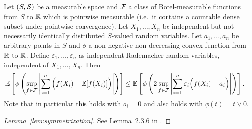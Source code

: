 \begin{lemma}
  \label{lem:symmetrization}

  Let $(S, \mathcal{S})$ be a measurable space and
  $\mathcal{F}$ a class of Borel-measurable functions
  from $S$ to $\mathbb{R}$ which is pointwise measurable
  (i.e.\ it contains a countable dense subset
  under pointwise convergence).
  Let $X_1, \ldots, X_n$
  be independent
  but not necessarily identically distributed
  $S$-valued random variables.
  Let $a_1, \ldots, a_n$ be arbitrary points in $S$
  and $\phi$ a non-negative non-decreasing convex function
  from $\mathbb{R}$ to $\mathbb{R}$.
  Define $\varepsilon_1, \ldots, \varepsilon_n$
  as independent Rademacher
  random variables,
  independent of $X_1, \ldots, X_n$.
  Then
  \begin{align*}
    \mathbb{E} \left[
      \phi \left(
        \sup_{f \in \mathcal{F}}
        \left|
        \sum_{i=1}^n
        \Big(
          f(X_i)
          - \mathbb{E}[f(X_i)]
        \Big)
        \right|
      \right)
    \right]
    &\leq
    \mathbb{E} \left[
      \phi \left(
        2
        \sup_{f \in \mathcal{F}}
        \left|
        \sum_{i=1}^n
        \varepsilon_i
        \Big(
          f(X_i)
          - a_i
        \Big)
        \right|
      \right)
    \right].
  \end{align*}
  Note that in particular this holds with $a_i = 0$
  and also holds with $\phi(t) = t \vee 0$.

\end{lemma}

\begin{proof}[Lemma~\ref{lem:symmetrization}]

  See Lemma~2.3.6 in
  \citet{van1996weak}.
\end{proof}

